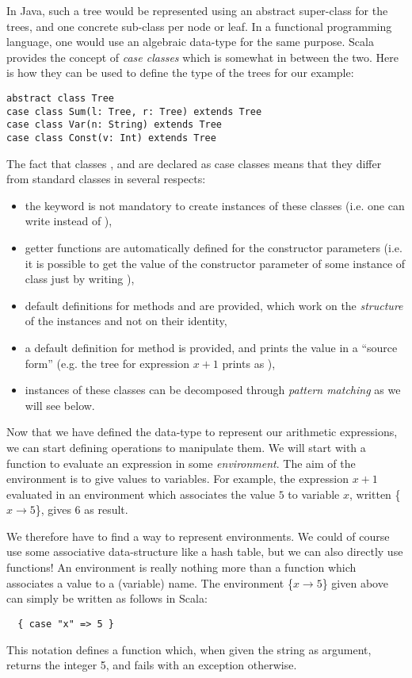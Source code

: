 \documentclass[a4paper,12pt,twoside,titlepage]{article}
\newcommand{\langname}[1]{#1\xspace}
\newcommand{\Scala}{\langname{Scala}}
\newcommand{\Java}{\langname{Java}}
\begin{document}
In \Java, such a tree would be represented using an abstract
super-class for the trees, and one concrete sub-class per node or
leaf. In a functional programming language, one would use an algebraic
data-type for the same purpose. \Scala provides the concept of
\emph{case classes} which is somewhat in between the two. Here is how
they can be used to define the type of the trees for our example:
\begin{lstlisting}
abstract class Tree
case class Sum(l: Tree, r: Tree) extends Tree
case class Var(n: String) extends Tree
case class Const(v: Int) extends Tree
\end{lstlisting}
The fact that classes ,  and  are
declared as case classes means that they differ from standard classes
in several respects:
\begin{itemize}
\item the  keyword is not mandatory to create instances of
  these classes (i.e. one can write  instead of
  ),
\item getter functions are automatically defined for the constructor
  parameters (i.e. it is possible to get the value of the 
  constructor parameter of some instance  of class
   just by writing ),
\item default definitions for methods  and
   are provided, which work on the \emph{structure} of
  the instances and not on their identity,
\item a default definition for method  is provided, and
  prints the value in a ``source form'' (e.g. the tree for expression
  $x+1$ prints as ),
\item instances of these classes can be decomposed through
  \emph{pattern matching} as we will see below.
\end{itemize}

Now that we have defined the data-type to represent our arithmetic
expressions, we can start defining operations to manipulate them. We
will start with a function to evaluate an expression in some
\emph{environment}. The aim of the environment is to give values to
variables. For example, the expression $x+1$ evaluated in an
environment which associates the value $5$ to variable $x$, written
\{$x\rightarrow 5$\}, gives $6$ as result.

We therefore have to find a way to represent environments. We could of
course use some associative data-structure like a hash table, but we
can also directly use functions! An environment is really nothing more
than a function which associates a value to a (variable) name. The
environment \{$x\rightarrow 5$\} given above can simply be written as
follows in \Scala:
\begin{lstlisting}
  { case "x" => 5 }
\end{lstlisting}
This notation defines a function which, when given the string
 as argument, returns the integer 5, and fails with an
exception otherwise.
\end{document}
